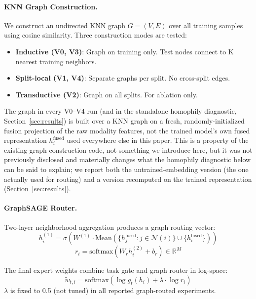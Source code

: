 \documentclass[twocolumn]{article}
\begin{document}
\paragraph{KNN Graph Construction.} We construct an undirected KNN graph $G = (V, E)$ over all training samples using cosine similarity. Three construction modes are tested:
\begin{itemize}
    \item \textbf{Inductive (V0, V3)}: Graph on training only. Test nodes connect to K nearest training neighbors.
    \item \textbf{Split-local (V1, V4)}: Separate graphs per split. No cross-split edges.
    \item \textbf{Transductive (V2)}: Graph on all splits. For ablation only.
\end{itemize}
The graph in every V0--V4 run (and in the standalone homophily diagnostic, Section~\ref{sec:results}) is built over a KNN graph on a fresh, randomly-initialized fusion projection of the raw modality features, not the trained model's own fused representation $h_i^{\text{fused}}$ used everywhere else in this paper. This is a property of the existing graph-construction code, not something we introduce here, but it was not previously disclosed and materially changes what the homophily diagnostic below can be said to explain; we report both the untrained-embedding version (the one actually used for routing) and a version recomputed on the trained representation (Section~\ref{sec:results}).

\paragraph{GraphSAGE Router.} Two-layer neighborhood aggregation produces a graph routing vector:
\begin{equation}
    h_i^{(1)} = \sigma(W^{(1)} \cdot \text{Mean}(\{h_j^{\text{fused}} : j \in \mathcal{N}(i)\} \cup \{h_i^{\text{fused}}\}))
\end{equation}
\begin{equation}
    r_i = \text{softmax}(W_r h_i^{(2)} + b_r) \in \mathbb{R}^M
\end{equation}

The final expert weights combine task gate and graph router in log-space:
\begin{equation}
    \tilde{w}_{t,i} = \text{softmax}(\log g_t(h_i) + \lambda \cdot \log r_i)
\end{equation}
$\lambda$ is fixed to 0.5 (not tuned) in all reported graph-routed experiments.
\end{document}
